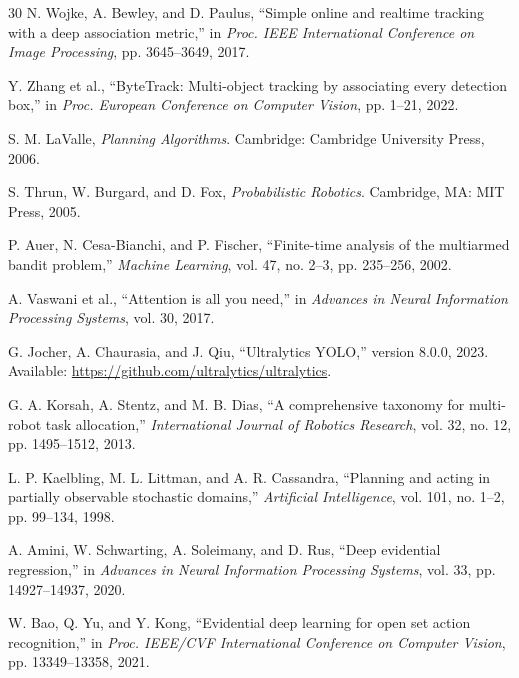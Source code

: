 \documentclass[runningheads]{llncs}
\begin{document}
\begin{thebibliography}{30}
N. Wojke, A. Bewley, and D. Paulus, ``Simple online and realtime tracking with a deep association metric,'' in \textit{Proc. IEEE International Conference on Image Processing}, pp. 3645--3649, 2017.

Y. Zhang et al., ``ByteTrack: Multi-object tracking by associating every detection box,'' in \textit{Proc. European Conference on Computer Vision}, pp. 1--21, 2022.

S. M. LaValle, \textit{Planning Algorithms}. Cambridge: Cambridge University Press, 2006.

S. Thrun, W. Burgard, and D. Fox, \textit{Probabilistic Robotics}. Cambridge, MA: MIT Press, 2005.

P. Auer, N. Cesa-Bianchi, and P. Fischer, ``Finite-time analysis of the multiarmed bandit problem,'' \textit{Machine Learning}, vol. 47, no. 2--3, pp. 235--256, 2002.

A. Vaswani et al., ``Attention is all you need,'' in \textit{Advances in Neural Information Processing Systems}, vol. 30, 2017.

G. Jocher, A. Chaurasia, and J. Qiu, ``Ultralytics YOLO,'' version 8.0.0, 2023. Available: \url{https://github.com/ultralytics/ultralytics}.

G. A. Korsah, A. Stentz, and M. B. Dias, ``A comprehensive taxonomy for multi-robot task allocation,'' \textit{International Journal of Robotics Research}, vol. 32, no. 12, pp. 1495--1512, 2013.

L. P. Kaelbling, M. L. Littman, and A. R. Cassandra, ``Planning and acting in partially observable stochastic domains,'' \textit{Artificial Intelligence}, vol. 101, no. 1--2, pp. 99--134, 1998.

A. Amini, W. Schwarting, A. Soleimany, and D. Rus, ``Deep evidential regression,'' in \textit{Advances in Neural Information Processing Systems}, vol. 33, pp. 14927--14937, 2020.

W. Bao, Q. Yu, and Y. Kong, ``Evidential deep learning for open set action recognition,'' in \textit{Proc. IEEE/CVF International Conference on Computer Vision}, pp. 13349--13358, 2021.

\end{thebibliography}
\end{document}
